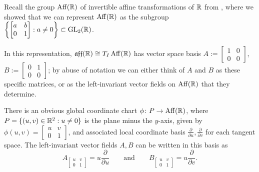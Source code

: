 \begin{example}\label{ex:Lie algebra of affine group}
	Recall the group $\operatorname{Aff}(\mathbb{R})$ of invertible affine transformations of $\mathbb{R}$ from , where we showed that we can represent $\operatorname{Aff}(\mathbb{R})$ as the subgroup $\left\{ \begin{bmatrix} a & b \\ 0 & 1 \end{bmatrix} : a \neq 0 \right\} \subset \operatorname{GL}_2(\mathbb{R})$.
	
	In this representation, $\mathfrak{aff}(\mathbb{R}) \cong T_I \operatorname{Aff}(\mathbb{R})$ has vector space basis $A := \begin{bmatrix} 1 & 0 \\ 0 & 0 \end{bmatrix}$, $B := \begin{bmatrix} 0 & 1 \\ 0 & 0 \end{bmatrix}$; by abuse of notation we can either think of $A$ and $B$ as these specific matrices, or as the left-invariant vector fields on $\operatorname{Aff}(\mathbb{R})$ that they determine.
	
	\begin{exercise}
		There is an obvious global coordinate chart $\phi \colon\thinspace\! P \to \operatorname{Aff}(\mathbb{R})$, where $P = \{(u,v) \in \mathbb{R}^2 : u \neq 0\}$ is the plane minus the $y$-axis, given by $\phi(u,v) = \begin{bmatrix}u & v \\ 0 & 1 \end{bmatrix}$, and associated local coordinate basis $\frac{\partial}{\partial u}, \frac{\partial}{\partial v}$ for each tangent space. The left-invariant vector fields $A,B$ can be written in this basis as
		\begin{equation}\label{eq:affine coords}
			A_{\begin{bmatrix} u & v \\ 0 & 1 \end{bmatrix}} = u \frac{\partial}{\partial u} \qquad \text{and} \qquad B_{\begin{bmatrix} u & v \\ 0 & 1 \end{bmatrix}} = u \frac{\partial }{\partial v}.
		\end{equation}
	\end{exercise}
	

\end{example}

